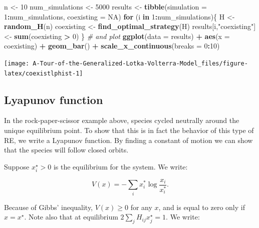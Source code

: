 \documentclass[]{book}
\newenvironment{Shaded}{\begin{snugshade}}{\end{snugshade}}
\newcommand{\CommentTok}[1]{\textcolor[rgb]{0.56,0.35,0.01}{\textit{#1}}}
\newcommand{\ControlFlowTok}[1]{\textcolor[rgb]{0.13,0.29,0.53}{\textbf{#1}}}
\newcommand{\DataTypeTok}[1]{\textcolor[rgb]{0.13,0.29,0.53}{#1}}
\newcommand{\DecValTok}[1]{\textcolor[rgb]{0.00,0.00,0.81}{#1}}
\newcommand{\KeywordTok}[1]{\textcolor[rgb]{0.13,0.29,0.53}{\textbf{#1}}}
\newcommand{\NormalTok}[1]{#1}
\newcommand{\OperatorTok}[1]{\textcolor[rgb]{0.81,0.36,0.00}{\textbf{#1}}}
\newcommand{\OtherTok}[1]{\textcolor[rgb]{0.56,0.35,0.01}{#1}}
\newcommand{\StringTok}[1]{\textcolor[rgb]{0.31,0.60,0.02}{#1}}
\begin{document}
\begin{Shaded}
\begin{Highlighting}[]
\NormalTok{n <-}\StringTok{ }\DecValTok{10}
\NormalTok{num_simulations <-}\StringTok{ }\DecValTok{5000}
\NormalTok{results <-}\StringTok{ }\KeywordTok{tibble}\NormalTok{(}\DataTypeTok{simulation =} \DecValTok{1}\OperatorTok{:}\NormalTok{num_simulations, }\DataTypeTok{coexisting =} \OtherTok{NA}\NormalTok{)}
\ControlFlowTok{for}\NormalTok{ (i }\ControlFlowTok{in} \DecValTok{1}\OperatorTok{:}\NormalTok{num_simulations)\{}
\NormalTok{  H <-}\StringTok{ }\KeywordTok{random_H}\NormalTok{(n)}
\NormalTok{  coexisting <-}\StringTok{ }\KeywordTok{find_optimal_strategy}\NormalTok{(H)}
\NormalTok{  results[i,}\StringTok{"coexisting"}\NormalTok{] <-}\StringTok{ }\KeywordTok{sum}\NormalTok{(coexisting }\OperatorTok{>}\StringTok{ }\DecValTok{0}\NormalTok{)}
\NormalTok{\}}
\CommentTok{# and plot}
\KeywordTok{ggplot}\NormalTok{(}\DataTypeTok{data =}\NormalTok{ results) }\OperatorTok{+}\StringTok{ }\KeywordTok{aes}\NormalTok{(}\DataTypeTok{x =}\NormalTok{ coexisting) }\OperatorTok{+}\StringTok{ }\KeywordTok{geom_bar}\NormalTok{() }\OperatorTok{+}\StringTok{ }\KeywordTok{scale_x_continuous}\NormalTok{(}\DataTypeTok{breaks =} \DecValTok{0}\OperatorTok{:}\DecValTok{10}\NormalTok{)}
\end{Highlighting}
\end{Shaded}

\begin{center}\texttt{[image: A-Tour-of-the-Generalized-Lotka-Volterra-Model\_files/figure-latex/coexistlphist-1]} \end{center}

\hypertarget{lyapunov-function}{%
\subsection{Lyapunov function}\label{lyapunov-function}}

In the rock-paper-scissor example above, species cycled neutrally around the unique equilibrium point. To show that this is in fact the behavior of this type of RE, we write a Lyapunov function. By finding a constant of motion we can show that the species will follow closed orbits.

Suppose \(x_{i}^\star > 0\) is the equilibrium for the system. We write:

\[
V(x) = -\sum_i x_i^\ast \log \frac{x_i}{x_i^\ast} .
\]

Because of Gibbs' inequality, \(V(x) \geq 0\) for any \(x\), and is equal to zero only if \(x = x^\star\). Note also that at equilibrium \(2 \sum_j H_{ij} x_j^\star = 1\). We write:
\end{document}
